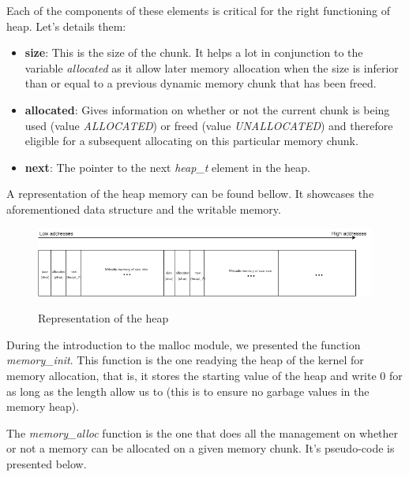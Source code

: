 Each of the components of these elements is critical for the right functioning of heap. Let's details them:
\begin{itemize}
	\item \textbf{size}: This is the size of the chunk. It helps a lot in conjunction to the variable \textit{allocated} as it allow later memory allocation when the size is inferior than or equal to a previous dynamic memory chunk that has been freed.
	\item \textbf{allocated}: Gives information on whether or not the current chunk is being used (value \textit{ALLOCATED}) or freed (value \textit{UNALLOCATED}) and therefore eligible for a subsequent allocating on this particular memory chunk.
	\item \textbf{next}: The pointer to the next \textit{heap\_t} element in the heap.
\end{itemize}

A representation of the heap memory can be found bellow. It showcases the aforementioned data structure and the writable memory.

\begin{figure}[H]
\begin{center}
\includegraphics[width=1\textwidth]{includes/figures/chapter5_heap_representation.png}  \\
\caption{Representation of the heap}
\end{center}
\label{fig:chapter5_heap_representation}
\end{figure}

During the introduction to the malloc module, we presented the function \textit{memory\_init}. This function is the one readying the heap of the kernel for memory allocation, that is, it stores the starting value of the heap and write 0 for as long as the length allow us to (this is to ensure no garbage values in the memory heap).

The \textit{memory\_alloc} function is the one that does all the management on whether or not a memory can be allocated on a given memory chunk. It's pseudo-code is presented below.

